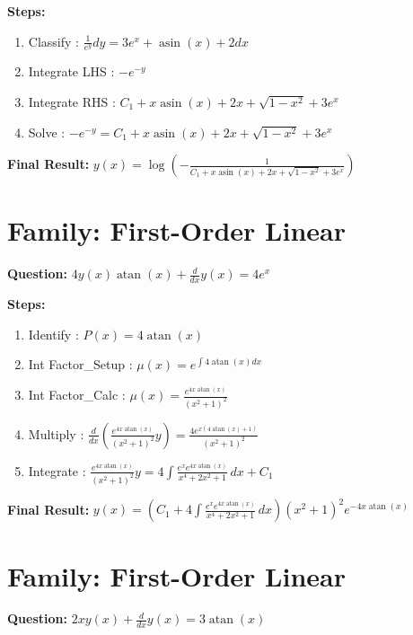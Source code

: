 \documentclass{article}
\begin{document}
\textbf{Steps:}
\begin{enumerate}
\item Classify :  $\frac{1}{e^{y}} dy = 3 e^{x} + \operatorname{asin}{\left(x \right)} + 2 dx$
\item Integrate LHS :  $- e^{- y}$
\item Integrate RHS :  $C_{1} + x \operatorname{asin}{\left(x \right)} + 2 x + \sqrt{1 - x^{2}} + 3 e^{x}$
\item Solve :  $- e^{- y} = C_{1} + x \operatorname{asin}{\left(x \right)} + 2 x + \sqrt{1 - x^{2}} + 3 e^{x}$
\end{enumerate}
\textbf{Final Result:} $y{\left(x \right)} = \log{\left(- \frac{1}{C_{1} + x \operatorname{asin}{\left(x \right)} + 2 x + \sqrt{1 - x^{2}} + 3 e^{x}} \right)}$

\section*{Family: First-Order Linear}
\textbf{Question:} $4 y{\left(x \right)} \operatorname{atan}{\left(x \right)} + \frac{d}{d x} y{\left(x \right)} = 4 e^{x}$

\textbf{Steps:}
\begin{enumerate}
\item Identify :  $P(x) = 4 \operatorname{atan}{\left(x \right)}$
\item Int Factor_Setup :  $\mu(x) = e^{\int 4 \operatorname{atan}{\left(x \right)} dx}$
\item Int Factor_Calc :  $\mu(x) = \frac{e^{4 x \operatorname{atan}{\left(x \right)}}}{\left(x^{2} + 1\right)^{2}}$
\item Multiply :  $\frac{d}{dx}(\frac{e^{4 x \operatorname{atan}{\left(x \right)}}}{\left(x^{2} + 1\right)^{2}}y) = \frac{4 e^{x \left(4 \operatorname{atan}{\left(x \right)} + 1\right)}}{\left(x^{2} + 1\right)^{2}}$
\item Integrate :  $\frac{e^{4 x \operatorname{atan}{\left(x \right)}}}{\left(x^{2} + 1\right)^{2}}y = 4 \int \frac{e^{x} e^{4 x \operatorname{atan}{\left(x \right)}}}{x^{4} + 2 x^{2} + 1}\, dx + C_1$
\end{enumerate}
\textbf{Final Result:} $y{\left(x \right)} = \left(C_{1} + 4 \int \frac{e^{x} e^{4 x \operatorname{atan}{\left(x \right)}}}{x^{4} + 2 x^{2} + 1}\, dx\right) \left(x^{2} + 1\right)^{2} e^{- 4 x \operatorname{atan}{\left(x \right)}}$

\section*{Family: First-Order Linear}
\textbf{Question:} $2 x y{\left(x \right)} + \frac{d}{d x} y{\left(x \right)} = 3 \operatorname{atan}{\left(x \right)}$
\end{document}
